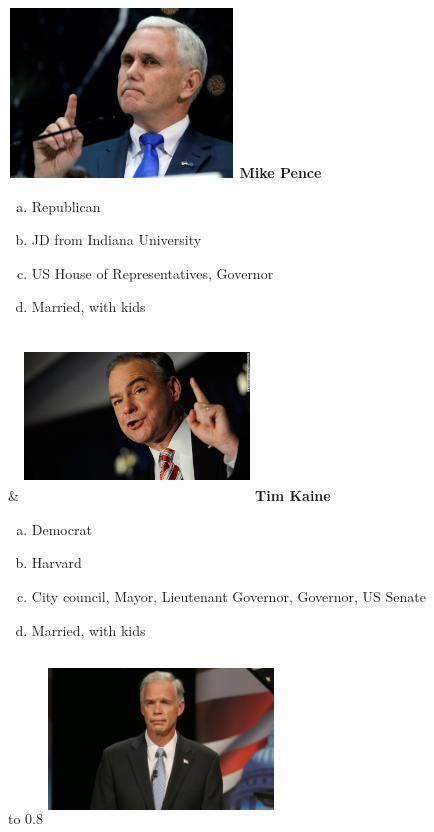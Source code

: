 \documentclass[twoside]{article}
\begin{document}
\begin{center}
\begin{tabu}
              \includegraphics[width=6cm,height=4.5cm,keepaspectratio]{images/profiles/pence.jpg}
              \vskip0.5cm
              {\bfseries\Large Mike Pence}
              \begin{enumerate}[a)]
                \item Republican
                \item JD from Indiana University
                \item US House of Representatives, Governor
                \item Married, with kids
              \end{enumerate}
              &
              \includegraphics[width=6cm,height=4.5cm,keepaspectratio]{images/profiles/kaine.jpg}
              \vskip0.5cm
              {\bfseries\Large Tim Kaine}
              \begin{enumerate}[a)]
                \item Democrat
                \item Harvard
                \item City council, Mayor, Lieutenant Governor, Governor, US Senate
                \item Married, with kids
              \end{enumerate}
            \end{tabu}
            \vfill
            \newpage
            \begin{tabu} to 0.8\textwidth { X[c] X[c]}
              \includegraphics[width=6cm,height=4.5cm,keepaspectratio]{images/profiles/johnson.jpg}

\end{tabu}
\end{center}
\end{document}
